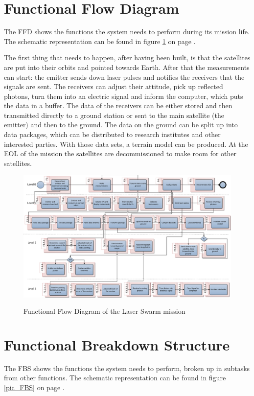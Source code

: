 \section{Functional Flow Diagram}
\label{section_FFD}
The \ac{FFD} shows the functions the system needs to perform during its mission life. The schematic representation can be found in figure \ref{pic_FFD} on page \pageref{pic_FFD}.

The first thing that needs to happen, after having been built, is that the satellites are put into their orbits and pointed towards Earth. After that the measurements can start: the emitter sends down laser pulses and notifies the receivers that the signals are sent. The receivers can adjust their attitude, pick up reflected photons, turn them into an electric signal and inform the computer, which puts the data in a buffer. The data of the receivers can be either stored and then transmitted directly to a ground station or sent to the main satellite (the emitter) and then to the ground. The data on the ground can be split up into data packages, which can be distributed to research institutes and other interested parties. With those data sets, a terrain model can be produced. At the \ac{EOL} of the mission the satellites are decommissioned to make room for other satellites.

\begin{landscape}
\begin{figure}[ht!]
\centering
\includegraphics[width=1.3\textheight]{chapters/img/FFD.png}
\label{pic_FFD}
\caption{Functional Flow Diagram of the Laser Swarm mission}
\end{figure}
\end{landscape}

\section{Functional Breakdown Structure}
\label{section_FBS}
The \ac{FBS} shows the functions the system needs to perform, broken up in subtasks from other functions. The schematic representation can be found in figure \ref{pic_FBS} on page \pageref{pic_FBS}.

